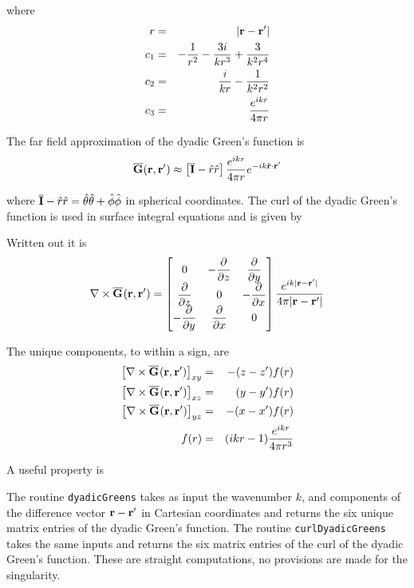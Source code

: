 \noindent where
\begin{eqnarray}
r &=& \vert \mathbf{r} - \mathbf{r}' \vert \\
c_1 &=& -\dfrac{1}{r^2} - \dfrac{3i}{k r^3} + \dfrac{3}{k^2 r^4} \\
c_2 &=& \dfrac{i}{kr} - \dfrac{1}{k^2r^2} \\
c_3 &=& \dfrac{e^{ikr}}{4\pi r}
\end{eqnarray}

The far field approximation of the dyadic Green's function is 
\begin{equation} \overline{\mathbf{G}}(\mathbf{r},\mathbf{r}') \approx \left[\overline{\mathbf{I}} - \hat{r}\hat{r}\right] \dfrac{e^{ikr}}{4\pi r} e^{-ik \hat{\mathbf{r}}\cdot\mathbf{r}' \label{dyadicGff}} 
 \end{equation}
 
\noindent where $\overline{\mathbf{I}} - \hat{r}\hat{r} = \hat{\theta}\hat{\theta} + \hat{\phi}\hat{\phi}$ in spherical coordinates.  The curl of the dyadic Green's function is used in surface integral equations and is given by 

Written out it is 
\begin{equation}
\nabla \times \overline{\mathbf{G}}_{}(\mathbf{r},\mathbf{r}') = \begin{bmatrix} {0} & {-\dfrac{\partial{}}{\partial{z}} } & {\dfrac{\partial{}}{\partial{y}} } \\ {\dfrac{\partial{}}{\partial{z}} } & {0} & {-\dfrac{\partial{}}{\partial{x}}} \\ {-\dfrac{\partial{}}{\partial{y}} } & {\dfrac{\partial{}}{\partial{x}}} & {0} \end{bmatrix}
\dfrac{e^{ik\vert \mathbf{r} - \mathbf{r}' \vert}}{4\pi   \vert \mathbf{r} - \mathbf{r}' \vert}
\end{equation}



The unique components, to within a sign, are 
\begin{eqnarray}
\left[\nabla \times \overline{\mathbf{G}}_{}(\mathbf{r},\mathbf{r}')\right]_{xy}  &=& -(z-z') f(r) \\
\left[\nabla \times \overline{\mathbf{G}}_{}(\mathbf{r},\mathbf{r}')\right]_{xz}&=& (y-y') f(r) \\ 
\left[\nabla \times \overline{\mathbf{G}}_{}(\mathbf{r},\mathbf{r}')\right]_{yz}&=& - (x-x') f(r) \\
f(r) &=& (i k r-1) \dfrac{e^{i k r}}{4 \pi r^3} 
\end{eqnarray}

A useful property is

\clearpage
\newpage
The routine \texttt{dyadicGreens} takes as input the wavenumber $k$, and components of the difference vector $\mathbf{r} - \mathbf{r}'$ in Cartesian coordinates and returns the six unique matrix entries of the dyadic Green's function.  The routine \texttt{curlDyadicGreens} takes the same inputs and returns the six matrix entries of the curl of the dyadic Green's function.  These are straight computations, no provisions are made for the singularity.  

